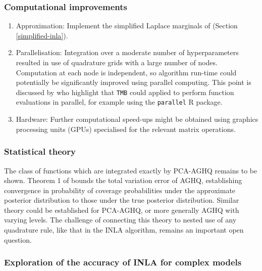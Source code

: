 \documentclass[a4paper, nobind]{templates/ociamthesis}
\providecommand{\tightlist}{%
  \setlength{\itemsep}{0pt}\setlength{\parskip}{0pt}}
\begin{document}
\hypertarget{computational-improvements}{%
\subsubsection{Computational improvements}\label{computational-improvements}}

\begin{enumerate}
\def\labelenumi{\arabic{enumi}.}
\tightlist
\item
  Approximation: Implement the simplified Laplace marginals of \textcite{wood2020simplified} (Section \ref{simplified-inla}).
\item
  Parallelisation: Integration over a moderate number of hyperparameters resulted in use of quadrature grids with a large number of nodes.
  Computation at each node is independent, so algorithm run-time could potentially be significantly improved using parallel computing.
  This point is discussed by \textcite{kristensen2016tmb} who highlight that \texttt{TMB} could applied to perform function evaluations in parallel, for example using the \texttt{parallel} R package.
\item
  Hardware: Further computational speed-ups might be obtained using graphics processing units (GPUs) specialised for the relevant matrix operations.
\end{enumerate}

\hypertarget{statistical-theory}{%
\subsubsection{Statistical theory}\label{statistical-theory}}

The class of functions which are integrated exactly by PCA-AGHQ remains to be shown.
Theorem 1 of \textcite{stringer2022fast} bounds the total variation error of AGHQ, establishing convergence in probability of coverage probabilities under the approximate posterior distribution to those under the true posterior distribution.
Similar theory could be established for PCA-AGHQ, or more generally AGHQ with varying levels.
The challenge of connecting this theory to nested use of any quadrature rule, like that in the INLA algorithm, remains an important open question.

\hypertarget{exploration-of-the-accuracy-of-inla-for-complex-models}{%
\subsubsection{Exploration of the accuracy of INLA for complex models}\label{exploration-of-the-accuracy-of-inla-for-complex-models}}
\end{document}
